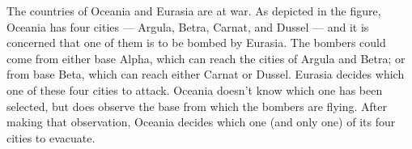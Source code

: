 \documentclass[addpoints, answers]{exam}
\begin{document}
\begin{questions}

\newpage


\question[20] 
The countries of Oceania and Eurasia are at war.
As depicted in the figure, Oceania has four cities —
Argula, Betra, Carnat, and Dussel — 
and it is concerned that one of them is to be bombed by Eurasia.
The bombers could come from either base Alpha,
which can reach the cities of Argula and Betra;
or from base Beta, which can reach either Carnat or Dussel.
Eurasia decides which one of these four cities to attack.
Oceania doesn’t know which one has been selected,
but does observe the base from which the bombers are flying.
After making that observation, Oceania decides which one 
(and only one) of its four cities to evacuate.


\end{questions}
\end{document}
